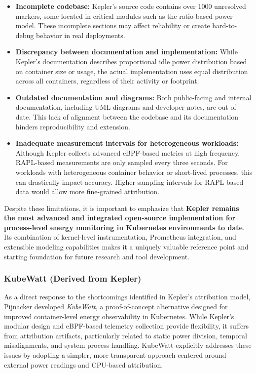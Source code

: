 \begin{itemize}
    \item \textbf{Incomplete codebase:} Kepler’s source code contains over 1000 unresolved  markers, some located in critical modules such as the ratio-based power model. These incomplete sections may affect reliability or create hard-to-debug behavior in real deployments.
    \item \textbf{Discrepancy between documentation and implementation:} While Kepler’s documentation describes proportional idle power distribution based on container size or usage, the actual implementation uses equal distribution across all containers, regardless of their activity or footprint.
    \item \textbf{Outdated documentation and diagrams:} Both public-facing and internal documentation, including UML diagrams and developer notes, are out of date. This lack of alignment between the codebase and its documentation hinders reproducibility and extension.
    \item \textbf{Inadequate measurement intervals for heterogeneous workloads:} Although Kepler collects advanced eBPF-based metrics at high frequency, RAPL-based measurements are only sampled every three seconds. For workloads with heterogeneous container behavior or short-lived processes, this can drastically impact accuracy. Higher sampling intervals for RAPL based data would allow more fine-grained attribution.
\end{itemize}

Despite these limitations, it is important to emphasize that \textbf{Kepler remains the most advanced and integrated open-source implementation for process-level energy monitoring in Kubernetes environments to date}. Its combination of kernel-level instrumentation, Prometheus integration, and extensible modeling capabilities makes it a uniquely valuable reference point and starting foundation for future research and tool development.

\subsubsection{KubeWatt (Derived from Kepler)}
\label{sec:kubewatt}

As a direct response to the shortcomings identified in Kepler's attribution model, Pijnacker developed \textit{KubeWatt}, a proof-of-concept alternative designed for improved container-level energy observability in Kubernetes. While Kepler's modular design and eBPF-based telemetry collection provide flexibility, it suffers from attribution artifacts, particularly related to static power division, temporal misalignments, and system process handling. KubeWatt explicitly addresses these issues by adopting a simpler, more transparent approach centered around external power readings and CPU-based attribution.

